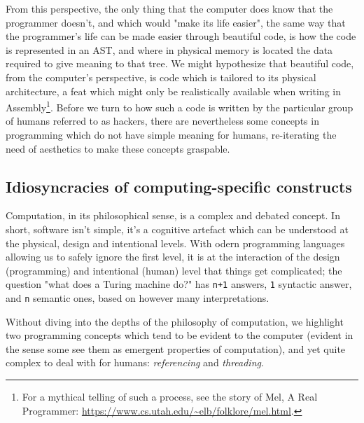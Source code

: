 From this perspective, the only thing that the computer does know that the programmer doesn't, and which would "make its life easier", the same way that the programmer's life can be made easier through beautiful code, is how the code is represented in an AST, and where in physical memory is located the data required to give meaning to that tree\citep{stansifer_study_1994}. We might hypothesize that beautiful code, from the computer's perspective, is code which is tailored to its physical architecture, a feat which might only be realistically available when writing in Assembly\footnote{For a mythical telling of such a process, see the story of Mel, A Real Programmer: \url{https://www.cs.utah.edu/~elb/folklore/mel.html}.}. Before we turn to how such a code is written by the particular group of humans referred to as hackers, there are nevertheless some concepts in programming which do not have simple meaning for humans, re-iterating the need of aesthetics to make these concepts graspable.

\subsection{Idiosyncracies of computing-specific constructs}
\label{subsec:idiosyncracies-computer-constructs}

Computation, in its philosophical sense, is a complex and debated concept\citep{rapaport_philosophy_2005,smith_origin_1998}. In short, software isn't simple, it's a cognitive artefact which can be understood at the physical, design and intentional levels\citep{moor_three_1978}. With odern programming languages allowing us to safely ignore the first level, it is at the interaction of the design (programming) and intentional (human) level that things get complicated; the question "what does a Turing machine do?" has \lstinline{n+1} answers, \lstinline{1} syntactic answer, and \lstinline{n} semantic ones, based on however many interpretations.

Without diving into the depths of the philosophy of computation, we highlight two programming concepts which tend to be evident to the computer (evident in the sense some see them as emergent properties of computation), and yet quite complex to deal with for humans: \emph{referencing} and \emph{threading}.

